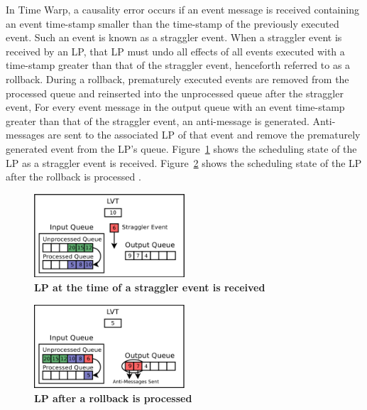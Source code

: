 \documentclass[11pt]{book}
\begin{document}
In Time Warp, a causality error occurs if an event message is received containing an event
time-stamp smaller than the time-stamp of the previously executed event.  Such an event is
known as a straggler event.  When a straggler event is received by an LP, that LP must
undo all effects of all events executed with a time-stamp greater than that of the
straggler event, henceforth referred to as a rollback.  During a rollback, prematurely
executed events are removed from the processed queue and reinserted into the unprocessed
queue after the straggler event, For every event message in the output queue with an event
time-stamp greater than that of the straggler event, an anti-message is generated.
Anti-messages are sent to the associated LP of that event and remove the prematurely
generated event from the LP's queue.  Figure~\ref{fig:rollback_stragglerrecvd} shows the
scheduling state of the LP as a straggler event is received.
Figure~\ref{fig:rollback_processed} shows the scheduling state of the LP after the
rollback is processed \cite{dickman}.

\begin{figure}[H]
    \centering
    \graphicspath{ {./figures/} }
    \includegraphics[width=0.5\textwidth,keepaspectratio]{rollback_recv}
    \caption{\textbf{LP at the time of a straggler event is received}}
    \label{fig:rollback_stragglerrecvd}
\end{figure}

\begin{figure}[H]
    \centering
    \graphicspath{ {./figures/} }
    \includegraphics[width=0.5\textwidth,keepaspectratio]{rollback_processed}
    \caption{\textbf{LP after a rollback is processed}}
    \label{fig:rollback_processed}
\end{figure}
\end{document}
